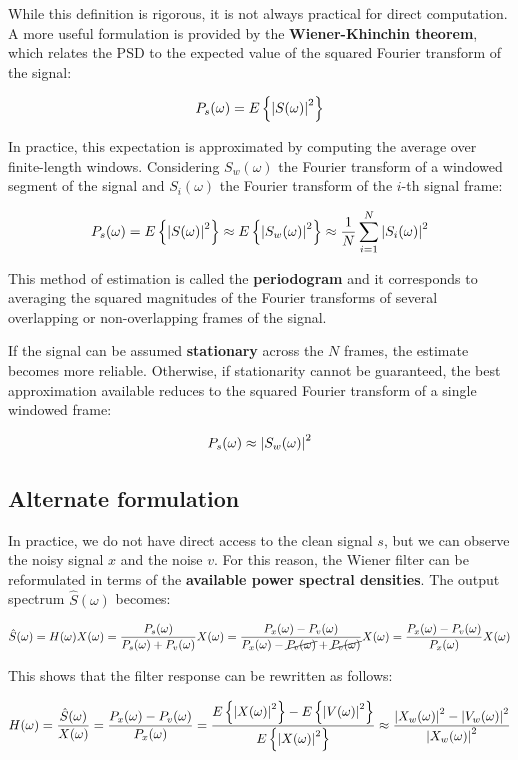 While this definition is rigorous, it is not always practical for direct computation.
A more useful formulation is provided by the \textbf{Wiener-Khinchin theorem}, which relates the PSD to the expected value of the squared Fourier transform of the signal:

\[
P_s(\omega) = E \left\{ \abs{S(\omega)}^2 \right\}
\]  

In practice, this expectation is approximated by computing the average over finite-length windows.
Considering $S_w(\omega)$ the Fourier transform of a windowed segment of the signal and $S_i(\omega)$ the Fourier transform of the $i$-th signal frame:

\[
P_s(\omega) = E \left\{ \abs{S(\omega)}^2 \right\} \approx E \left\{ \abs{S_w(\omega)}^2 \right\} 
\approx \frac{1}{N} \sum_{i=1}^N \abs{S_i(\omega)}^2
\]

This method of estimation is called the \textbf{periodogram} and it corresponds to averaging the squared magnitudes of the Fourier transforms of several overlapping or non-overlapping frames of the signal.

If the signal can be assumed \textbf{stationary} across the $N$ frames, the estimate becomes more reliable.
Otherwise, if stationarity cannot be guaranteed, the best approximation available reduces to the squared Fourier transform of a single windowed frame:  

\[
P_s(\omega) \approx \abs{S_w(\omega)}^2
\]

\clearpage

\subsection{Alternate formulation}
In practice, we do not have direct access to the clean signal $s$, but we can observe the noisy signal $x$ and the noise $v$.
For this reason, the Wiener filter can be reformulated in terms of the \textbf{available power spectral densities}.  
The output spectrum $\hat{S}(\omega)$ becomes:

\[
\hat{S}(\omega) = H(\omega) X(\omega) 
= \frac{P_s(\omega)}{P_s(\omega) + P_v(\omega)} X(\omega)
= \frac{P_x(\omega) - P_v(\omega)}{P_x(\omega) - \cancel{P_v(\omega)} + \cancel{P_v(\omega)}} X(\omega)
= \frac{P_x(\omega) - P_v(\omega)}{P_x(\omega)} X(\omega)
\]  

This shows that the filter response can be rewritten as follows:

\[
H(\omega) = \frac{\hat{S}(\omega)}{X(\omega)}
= \frac{P_x(\omega) - P_v(\omega)}{P_x(\omega)} 
= \frac{E \left\{ \abs{X(\omega)}^2 \right\} - E \left\{ \abs{V(\omega)}^2 \right\}}{E \left\{ \abs{X(\omega)}^2 \right\}} 
\approx \frac{\abs{X_w(\omega)}^2 - \abs{V_w(\omega)}^2}{\abs{X_w(\omega)}^2}
\]  

